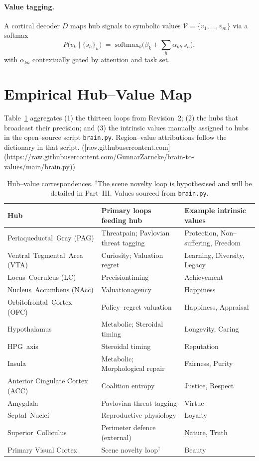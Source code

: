 \documentclass[11pt]{article}
\begin{document}
\paragraph{Value tagging.}  A cortical decoder $D$ maps hub signals to symbolic values
$\mathcal{V} = \{v_1,\dots,v_m\}$ via a softmax
\begin{equation}
    P\bigl(v_k\mid \{s_h\}_h\bigr)\;=\; \mathrm{softmax}_k\bigl(\beta_k + \sum_h \alpha_{kh}\,s_h\bigr),
\end{equation}
with $\alpha_{kh}$ contextually gated by attention and task set.

\section{Empirical Hub--Value Map}
Table~\ref{tab:hv} aggregates
(1) the thirteen loops from Revision~2; (2) the hubs that broadcast their precision; and (3) the intrinsic values manually assigned to hubs in the open--source script \texttt{brain.py}.  Region--value attributions follow the dictionary in that script. ([raw.githubusercontent.com](https://raw.githubusercontent.com/GunnarZarncke/brain-to-values/main/brain.py))

\begin{table}[h]
\centering
\footnotesize
\begin{tabular}{@{}lll@{}}
\toprule
Hub & Primary loops feeding hub & Example intrinsic values \\
\midrule
Periaqueductal~Gray (PAG) & Threat\/pain; Pavlovian threat tagging & Protection, Non--suffering, Freedom\\
Ventral~Tegmental~Area (VTA) & Curiosity; Valuation regret & Learning, Diversity, Legacy\\
Locus~Coeruleus (LC) & Precision\/timing & Achievement\\
Nucleus~Accumbens (NAcc) & Valuation\/agency & Happiness\\
Orbitofrontal~Cortex (OFC) & Policy--regret valuation & Happiness, Appraisal\\
Hypothalamus & Metabolic; Steroidal timing & Longevity, Caring\\
HPG~axis & Steroidal timing & Reputation\\
Insula & Metabolic; Morphological repair & Fairness, Purity\\
Anterior Cingulate Cortex (ACC) & Coalition entropy & Justice, Respect\\
Amygdala & Pavlovian threat tagging & Virtue\\
Septal~Nuclei & Reproductive physiology & Loyalty\\
Superior~Colliculus & Perimeter defence (external) & Nature, Truth\\
Primary Visual Cortex & Scene novelty loop$^{\dagger}$ & Beauty\\
\bottomrule
\end{tabular}
\caption{Hub--value correspondences.  $^{\dagger}$The scene novelty loop is hypothesised and will be detailed in Part~III. Values sourced from \texttt{brain.py}.}
\label{tab:hv}
\end{table}
\end{document}
